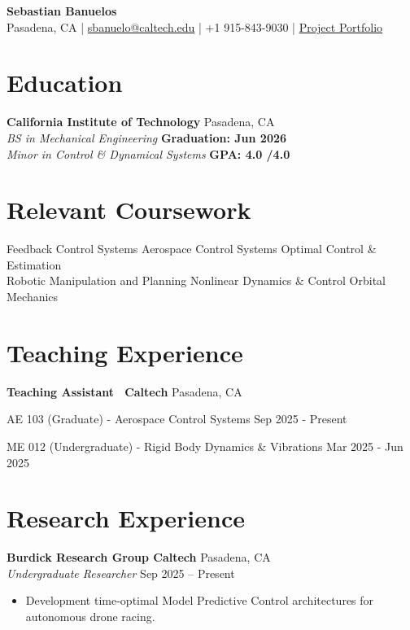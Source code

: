\documentclass[11pt,a4paper]{article}
\begin{document}
\begin{center}
    {\LARGE \textbf{Sebastian Banuelos}}\\[4pt]
    Pasadena, CA \quad | \quad 
    \href{mailto:sbanuelo@caltech.edu}{sbanuelo@caltech.edu} \quad | \quad 
    +1 915-843-9030 \quad | \quad \href{https://sebastianba28.github.io}{Project Portfolio}
\end{center}

\section*{Education}
\textbf{California Institute of Technology} \hfill Pasadena, CA\\
\textit{BS in Mechanical Engineering} \hfill \textbf{Graduation: Jun 2026}\\
\textit{Minor in Control \& Dynamical Systems} \hfill \textbf{GPA: 4.0  /4.0}

\section*{Relevant Coursework}
Feedback Control Systems \textbar{} Aerospace Control Systems \textbar{} Optimal Control  \& Estimation \\
Robotic Manipulation and Planning \textbar{} Nonlinear Dynamics \& Control \textbar{} 
Orbital Mechanics

\section*{Teaching Experience}
\noindent\textbf{Teaching Assistant \textbar \, Caltech} \hfill Pasadena, CA

\noindent AE 103 (Graduate) - Aerospace Control Systems \hfill Sep 2025 - Present

\noindent ME 012 (Undergraduate) - Rigid Body Dynamics \& Vibrations \hfill Mar 2025 - Jun 2025

\section*{Research Experience}

\textbf{Burdick Research Group \textbar{} Caltech} \hfill Pasadena, CA\\
\textit{Undergraduate Researcher} \hfill Sep 2025 -- Present
\begin{itemize}[leftmargin=1.2em, itemsep=0.2pt, topsep=0.4pt, after=\vspace{4pt}]
    \item Development time-optimal Model Predictive Control architectures for autonomous drone racing.
\end{itemize}
\end{document}
